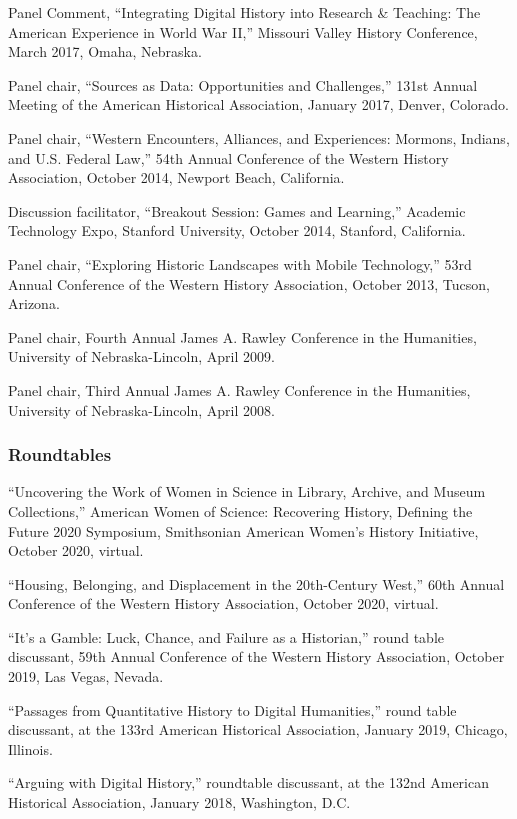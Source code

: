 Panel Comment, ``Integrating Digital History into Research \& Teaching:
The American Experience in World War II,'' Missouri Valley History
Conference, March 2017, Omaha, Nebraska.

Panel chair, ``Sources as Data: Opportunities and Challenges,'' 131st
Annual Meeting of the American Historical Association, January 2017,
Denver, Colorado.

Panel chair, ``Western Encounters, Alliances, and Experiences: Mormons,
Indians, and U.S. Federal Law,'' 54th Annual Conference of the Western
History Association, October 2014, Newport Beach, California.

Discussion facilitator, ``Breakout Session: Games and Learning,''
Academic Technology Expo, Stanford University, October 2014, Stanford,
California.

Panel chair, ``Exploring Historic Landscapes with Mobile Technology,''
53rd Annual Conference of the Western History Association, October 2013,
Tucson, Arizona.

Panel chair, Fourth Annual James A. Rawley Conference in the Humanities,
University of Nebraska-Lincoln, April 2009.

Panel chair, Third Annual James A. Rawley Conference in the Humanities,
University of Nebraska-Lincoln, April 2008.

\subsubsection{Roundtables}\label{roundtables}

``Uncovering the Work of Women in Science in Library, Archive, and
Museum Collections,'' American Women of Science: Recovering History,
Defining the Future 2020 Symposium, Smithsonian American Women's History
Initiative, October 2020, virtual.

``Housing, Belonging, and Displacement in the 20th-Century West,'' 60th
Annual Conference of the Western History Association, October 2020,
virtual.

``It's a Gamble: Luck, Chance, and Failure as a Historian,'' round table
discussant, 59th Annual Conference of the Western History Association,
October 2019, Las Vegas, Nevada.

``Passages from Quantitative History to Digital Humanities,'' round
table discussant, at the 133rd American Historical Association, January
2019, Chicago, Illinois.

``Arguing with Digital History,'' roundtable discussant, at the 132nd
American Historical Association, January 2018, Washington, D.C.

